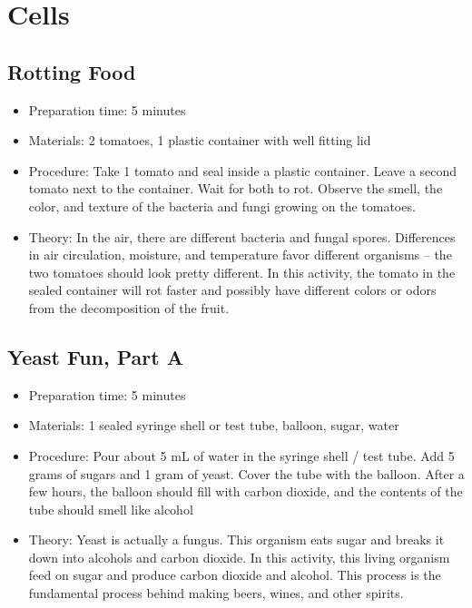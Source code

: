 \section{Cells}
\subsection{Rotting Food}
\begin{itemize}
\item{Preparation time: 5 minutes}
\item{Materials: 2 tomatoes, 1 plastic container with well fitting lid}
\item{Procedure: Take 1 tomato and seal inside a plastic container. Leave a second tomato next to the container. Wait for both to rot. Observe the smell, the color, and texture of the bacteria and fungi growing on the tomatoes.}
\item{Theory: In the air, there are different bacteria and fungal spores. Differences in air circulation, moisture, and temperature favor different organisms – the two tomatoes should look pretty different. In this activity, the tomato in the sealed container will rot faster and possibly have different colors or odors from the decomposition of the fruit.}
\end{itemize}


\subsection{Yeast Fun, Part A}
\begin{itemize}
\item{Preparation time: 5 minutes}
\item{Materials: 1 sealed syringe shell or test tube, balloon, sugar, water}
\item{Procedure: Pour about 5 mL of water in the syringe shell / test tube. Add 5 grams of sugars and 1 gram of yeast. Cover the tube with the balloon. After a few hours, the balloon should fill with carbon dioxide, and the contents of the tube should smell like alcohol}
\item{Theory: Yeast is actually a fungus. This organism eats sugar and breaks it down into alcohols and carbon dioxide. In this activity, this living organism feed on sugar and produce carbon dioxide and alcohol. This process is the fundamental process behind making beers, wines, and other spirits.}
\end{itemize}


